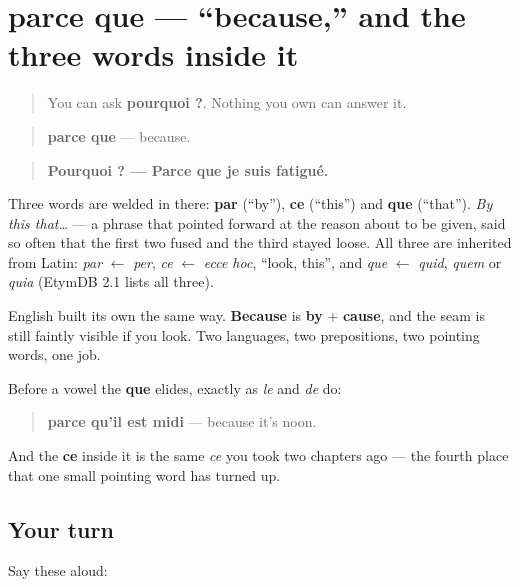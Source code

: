 \section[parce que]{parce que — \textquotedblleft{}because,\textquotedblright{} and the three words inside it}

\label{lesson:FR-C36-parce-que}



\begin{quote}
You can ask \textbf{pourquoi ?}. Nothing you own can answer it.
\end{quote}

\begin{cousinweb}
\begin{quote}
\textbf{parce que} — because.
\end{quote}

\begin{quote}
\textbf{Pourquoi ? — Parce que je suis fatigué.}
\end{quote}

Three words are welded in there: \textbf{par} (\textquotedblleft{}by\textquotedblright{}), \textbf{ce} (\textquotedblleft{}this\textquotedblright{}) and \textbf{que} (\textquotedblleft{}that\textquotedblright{}). \emph{By this that…} — a phrase that pointed forward at the reason about to be given, said so often that the first two fused and the third stayed loose. All three are inherited from Latin: \emph{par} $\leftarrow$ \emph{per}, \emph{ce} $\leftarrow$ \emph{ecce hoc}, \textquotedblleft{}look, this\textquotedblright{}, and \emph{que} $\leftarrow$ \emph{quid}, \emph{quem} or \emph{quia} (EtymDB 2.1 lists all three).

English built its own the same way. \textbf{Because} is \textbf{by} + \textbf{cause}, and the seam is still faintly visible if you look. Two languages, two prepositions, two pointing words, one job.

Before a vowel the \textbf{que} elides, exactly as \emph{le} and \emph{de} do:

\begin{quote}
\textbf{parce qu'il est midi} — because it's noon.
\end{quote}

And the \textbf{ce} inside it is the same \emph{ce} you took two chapters ago — the fourth place that one small pointing word has turned up.
\end{cousinweb}

\subsection*{Your turn}
Say these aloud:

